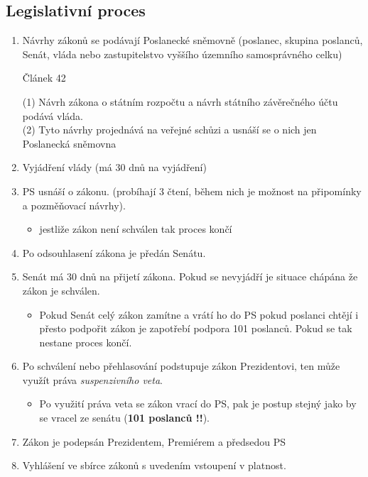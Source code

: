 \documentclass[10pt,a4paper,
twoside,%
]{report}
\newcommand{\ust}[1]{\begin{footnotesize}%
\begin{center}
Článek #1
\end{center}
\end{footnotesize}}%
\begin{document}
\subsection{Legislativní proces}
\begin{enumerate}
\item Návrhy zákonů se podávají Poslanecké sněmovně (poslanec, skupina poslanců, Senát, vláda nebo zastupitelstvo vyššího územního samosprávného celku)
\begin{footnotesize}
\ust{42}{
(1) Návrh zákona o státním rozpočtu a návrh státního závěrečného účtu podává vláda.\\
(2) Tyto návrhy projednává na veřejné schůzi a usnáší se o nich jen Poslanecká sněmovna}
\end{footnotesize}
\item Vyjádření vlády (má 30 dnů na vyjádření)


\item PS usnáší o zákonu. (probíhají 3 čtení, během nich je možnost na připomínky a pozměňovací návrhy).
\begin{itemize}
\item jestliže zákon není schválen tak \textsf{proces končí}
\end{itemize}

\item Po odsouhlasení zákona je předán Senátu.

\item Senát má 30 dnů na přijetí zákona. Pokud se nevyjádří je situace chápána že zákon je schválen.
\begin{itemize}
\item Pokud Senát celý zákon zamítne a vrátí ho do PS pokud poslanci chtějí i přesto podpořit zákon je zapotřebí podpora 101 poslanců. Pokud se tak nestane \textsf{proces končí.}
\end{itemize}
\item Po schválení nebo přehlasování podstupuje zákon Prezidentovi, ten může využít práva \emph{suspenzivního veta}.
\begin{itemize}
\item Po využití práva veta se zákon vrací do PS, pak je postup stejný jako by se vracel ze senátu (\textbf{101 poslanců !!}).
\end{itemize}
\item Zákon je podepsán Prezidentem, Premiérem a předsedou PS

\item Vyhlášení ve sbírce zákonů s uvedením vstoupení v platnost.
\end{enumerate}
\end{document}
